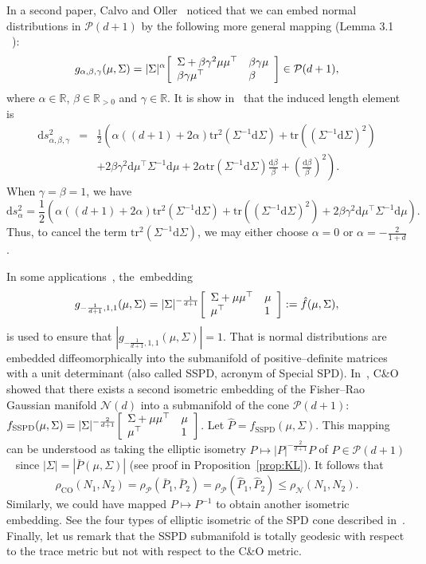 \documentclass[entropy,article,accept,oneauthor,pdftex,entropy]{Definitions/mdpi}
\def\SSPD{\mathrm{SSPD}}
\def\CO{\mathrm{CO}}
\def\bbR{\mathbb{R}}
\def\mattwotwo#1#2#3#4{{\left[\begin{array}{ll}#1 & #2\cr #3 & #4\end{array}\right]}}
\def\tr{\mathrm{tr}}
\def\calN{\mathcal{N}}
\def\calP{\mathcal{P}}
\def\dbeta{\mathrm{d}\beta}
\def\barP{{\bar P}}
\def\dSigma{\mathrm{d}\Sigma}
\def\dmu{\mathrm{d}\mu}
\def\ds{\mathrm{d}s}
\def\bbR{\mathbb{R}}
\begin{document}
\begin{Remark}\label{rk:secondco}
In a second paper, Calvo and Oller~\cite{SDPElliptical-2002} noticed that we can embed normal distributions in $\calP(d+1)$ by the following more general mapping ({Lemma 3.1}%
~\cite{SDPElliptical-2002}):
\begin{equation}
g_{\alpha,\beta,\gamma}(\mu,\Sigma)=
|\Sigma|^{\alpha} \mattwotwo{\Sigma+\beta\gamma^2\mu\mu^\top}{\beta\gamma\mu}{\beta\gamma\mu^\top}{\beta}\in\calP(d+1),
\end{equation}
where $\alpha\in\bbR$, $\beta\in\bbR_{>0}$ and $\gamma\in\bbR$.
It is show in~\cite{SDPElliptical-2002} that the induced length element is
\begin{eqnarray*}
\ds^2_{\alpha,\beta,\gamma}&=&\frac{1}{2}\left(
\alpha ((d+1)+2\alpha)\tr^2(\Sigma^{-1}\dSigma)+\tr((\Sigma^{-1}\dSigma)^2)\right.\\
&&\left.
+2\beta\gamma^2\dmu^\top\Sigma^{-1}\dmu+2\alpha \tr(\Sigma^{-1}\dSigma)\frac{\dbeta}{\beta}+
\left(\frac{\dbeta}{\beta}\right)^2
\right).
\end{eqnarray*}
When $\gamma=\beta=1$, we have
$$
\ds^2_\alpha=\frac{1}{2}\left(
\alpha ((d+1)+2\alpha)\tr^2(\Sigma^{-1}\dSigma)+\tr((\Sigma^{-1}\dSigma)^2)
+2\beta\gamma^2\dmu^\top\Sigma^{-1}\dmu
\right).
$$
Thus, to cancel the term $\tr^2(\Sigma^{-1}\dSigma)$, we may either choose $\alpha=0$ or $\alpha=-\frac{2}{1+d}$.

In some applications~\cite{popovic2022measure}, the~embedding
\begin{equation}\label{eq:g}
g_{-\frac{1}{d+1},1,1}(\mu,\Sigma)=|\Sigma|^{-\frac{1}{d+1}} \mattwotwo{\Sigma+\mu\mu^\top}{\mu}{\mu^\top}{1}:=\hat{f}(\mu,\Sigma),
\end{equation}
is used to ensure that $\left|g_{-\frac{1}{d+1},1,1}(\mu,\Sigma)\right|=1$.
That is normal distributions are embedded diffeomorphically into the submanifold of positive–definite matrices with a unit determinant (also called SSPD, acronym of Special SPD).
In~\cite{SDPElliptical-2002}, C\&O showed that there exists a second isometric embedding of the Fisher–Rao Gaussian manifold $\calN(d)$ into a submanifold of the cone $\calP(d+1)$: $f_\SSPD(\mu,\Sigma)=|\Sigma|^{-\frac{2}{d+1}} \mattwotwo{\Sigma+\mu\mu^\top}{\mu}{\mu^\top}{1}$.
Let $\hat{P}=f_\SSPD(\mu,\Sigma)$. This  mapping can be understood as taking the elliptic isometry ${P}\mapsto {|P|}^{-\frac{2}{d+1}} {P}$ of $P\in\calP(d+1)$~\cite{EllipticIsometrySPD-2021} since $|\Sigma|=|\bar{P}(\mu,\Sigma)|$ (see proof in Proposition~\ref{prop:KL}). 
It follows that
$$
\rho_\CO(N_1,N_2)=\rho_\calP(\barP_1,\barP_2)=\rho_\calP(\hat{P}_1,\hat{P}_2) \leq \rho_\calN(N_1,N_2).
$$
Similarly, we could have mapped ${P}\mapsto P^{-1}$ to obtain another isometric embedding.
See the four types of elliptic isometric of the SPD cone described in~\cite{EllipticIsometrySPD-2021}.
Finally, let us remark that the SSPD submanifold is totally geodesic with respect to the trace metric but not with respect to the C\&O metric.
\end{Remark}
\end{document}
